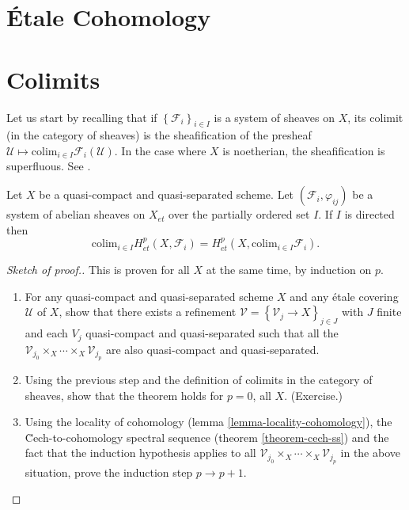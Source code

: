 \section{\'Etale Cohomology}
\label{section-etale-cohomology}


\section{Colimits}
\label{section-colimit}

\noindent
Let us start by recalling that if $\left\{\mathcal{F}_i\right\}_{i\in I}$ is a 
system of sheaves on $X$, its colimit (in the category of sheaves) is the 
sheafification of the presheaf $\mathcal{U} \mapsto \text{colim}_{i\in I} 
\mathcal{F}_i(\mathcal{U})$. In the case where $X$ is noetherian, the 
sheafification is superfluous. See \cite{H}.

\begin{theorem}
Let $X$ be a quasi-compact and quasi-separated scheme. Let 
$\left(\mathcal{F}_i, \varphi_{ij}\right)$ be a system of abelian sheaves on 
$X_{et}$ over the partially ordered set $I$. If $I$ is directed then
$$
\text{colim}_{i\in I} H_{et}^p(X, \mathcal{F}_i) = H_{et}^p(X, 
\text{colim}_{i\in I} \mathcal{F}_i).
$$
\end{theorem}

\begin{proof}[Sketch of proof.] 
This is proven for all $X$ at the same time, by induction on $p$. 
\begin{enumerate}
\item 
For any quasi-compact and quasi-separated scheme $X$ and any \'etale covering 
$\mathcal{U}$ of $X$, show that there exists a refinement $\mathcal{V} 
=\left\{\mathcal{V}_j \to X\right\}_{j\in J}$ with $J$ finite and each $V_j$ 
quasi-compact and quasi-separated such that all the $\mathcal{V}_{j_0} \times_X 
\cdots \times_X \mathcal{V}_{j_p}$ are also quasi-compact and quasi-separated. 
\item 
Using the previous step and the definition of colimits in the category of 
sheaves, show that the theorem holds for $p=0$, all $X$. (Exercise.)
\item 
Using the locality of cohomology (lemma \ref{lemma-locality-cohomology}), the \u 
Cech-to-cohomology spectral sequence (theorem 
\ref{theorem-cech-ss}) and the fact that the induction 
hypothesis applies to all $\mathcal{V}_{j_0}\times_X \cdots \times_X 
\mathcal{V}_{j_p}$ in the above situation, prove the induction step $p\to p+1$. 
\end{enumerate}
\end{proof}

